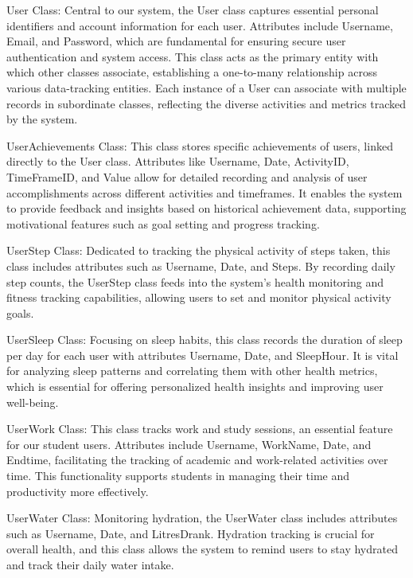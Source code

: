 \documentclass[12pt]{article}
\begin{document}
User Class: Central to our system, the User class captures essential personal identifiers and account information for each user. Attributes include Username, Email, and Password, which are fundamental for ensuring secure user authentication and system access. This class acts as the primary entity with which other classes associate, establishing a one-to-many relationship across various data-tracking entities. Each instance of a User can associate with multiple records in subordinate classes, reflecting the diverse activities and metrics tracked by the system.\par

UserAchievements Class: This class stores specific achievements of users, linked directly to the User class. Attributes like Username, Date, ActivityID, TimeFrameID, and Value allow for detailed recording and analysis of user accomplishments across different activities and timeframes. It enables the system to provide feedback and insights based on historical achievement data, supporting motivational features such as goal setting and progress tracking.\par

UserStep Class: Dedicated to tracking the physical activity of steps taken, this class includes attributes such as Username, Date, and Steps. By recording daily step counts, the UserStep class feeds into the system’s health monitoring and fitness tracking capabilities, allowing users to set and monitor physical activity goals.\par

UserSleep Class: Focusing on sleep habits, this class records the duration of sleep per day for each user with attributes Username, Date, and SleepHour. It is vital for analyzing sleep patterns and correlating them with other health metrics, which is essential for offering personalized health insights and improving user well-being.\par

UserWork Class: This class tracks work and study sessions, an essential feature for our student users. Attributes include Username, WorkName, Date, and Endtime, facilitating the tracking of academic and work-related activities over time. This functionality supports students in managing their time and productivity more effectively.\par

UserWater Class: Monitoring hydration, the UserWater class includes attributes such as Username, Date, and LitresDrank. Hydration tracking is crucial for overall health, and this class allows the system to remind users to stay hydrated and track their daily water intake.\par
\end{document}
